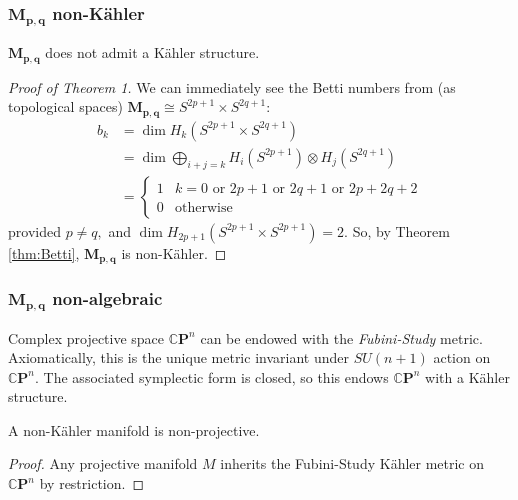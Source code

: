 \subsubsection{$\mathbf{M_{p,q}}$ non-K\"ahler}

\begin{theorem}
    $\mathbf{M_{p,q}}$ does not admit a K\"ahler structure.
\end{theorem}

\begin{proof}[Proof of Theorem 1]
    We can immediately see the Betti numbers from (as topological spaces) $\mathbf{M_{p,q}} \cong S^{2p+1}\times S^{2q+1}$:
    \begin{align*}
    b_k &= \dim H_k(S^{2p+1}\times S^{2q+1}) \\
    &= \dim \bigoplus_{i+j = k} H_i(S^{2p+1}) \otimes H_j(S^{2q+1})\\ 
    &= \begin{cases}
    1 &  k=0 \text{ or } 2p+1 \text{ or } 2q+1 \text{ or } 2p+2q+2 \\
    0 & \text{otherwise}
    \end{cases}
    \end{align*}
    provided $p\neq q,$ and $\dim H_{2p+1}(S^{2p+1}\times S^{2p+1})= 2.$ So, by Theorem \ref{thm:Betti}, $\mathbf{M_{p,q}}$ is non-K\"ahler.
\end{proof}


\subsubsection{$\mathbf{M_{p,q}}$ non-algebraic}

\begin{lemma}
    Complex projective space $\mathbb{C}\mathbf{P}^n$ can be endowed with the \textit{Fubini-Study} metric. Axiomatically, this is the unique metric invariant under $SU(n+1)$ action on $\mathbb{C}\mathbf{P}^n.$ The associated symplectic form is closed, so this endows $\mathbb{C}\mathbf{P}^n$ with a K\"ahler structure.
\end{lemma}

\begin{theorem}
    A non-K\"ahler manifold is non-projective.
\end{theorem}

\begin{proof}
    Any projective manifold $M$ inherits the Fubini-Study K\"ahler metric on $\mathbb{C}\mathbf{P}^n$ by restriction.
\end{proof}

